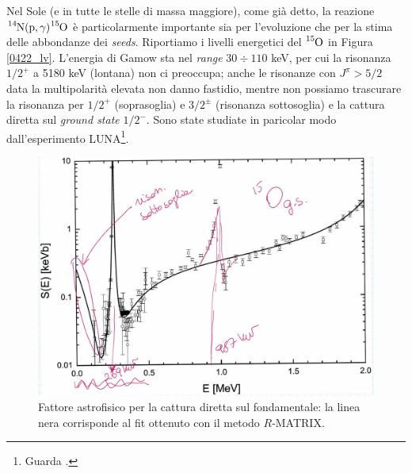 \noindent Nel Sole (e in tutte le stelle di massa maggiore), come già detto, la reazione $\ce{^{14}N(p,\gamma)\ce{^{15}O}}$ è particolarmente importante sia per l'evoluzione che per la stima delle abbondanze dei \textit{seeds}. Riportiamo i livelli energetici del $\ce{^{15}O}$ in Figura \ref{0422_lv}. L'energia di Gamow sta nel \textit{range} $30\div 110$ keV, per cui la risonanza $1/2^+$ a 5180 keV (lontana) non ci preoccupa; anche le risonanze con $J^\pi> 5/2$ data la multipolarità elevata non danno fastidio, mentre non possiamo trascurare la risonanza per $1/2^+$ (soprasoglia) e $3/2^\pm$ (risonanza sottosoglia) e la cattura diretta sul \textit{ground state} $1/2^-$. Sono state studiate in paricolar modo dall'esperimento LUNA\footnote{Guarda .}.

\begin{figure}[h]
	\centering
	\includegraphics[scale=0.5]{Immagini/0422_0-Se.png}
	\caption{Fattore astrofisico per la cattura diretta sul fondamentale: la linea nera corrisponde al fit ottenuto con il metodo $R$-MATRIX.}
	\label{0422_cattura}
\end{figure}

